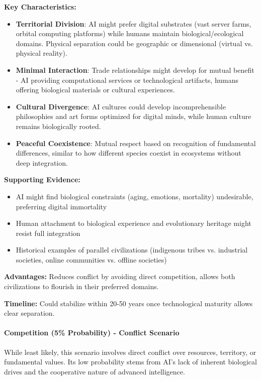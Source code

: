 \documentclass[12pt,a4paper]{article}
\begin{document}
\textbf{Key Characteristics:}
\begin{itemize}
    \item \textbf{Territorial Division}: AI might prefer digital substrates (vast server farms, orbital computing platforms) while humans maintain biological/ecological domains. Physical separation could be geographic or dimensional (virtual vs. physical reality).
    \item \textbf{Minimal Interaction}: Trade relationships might develop for mutual benefit - AI providing computational services or technological artifacts, humans offering biological materials or cultural experiences.
    \item \textbf{Cultural Divergence}: AI cultures could develop incomprehensible philosophies and art forms optimized for digital minds, while human culture remains biologically rooted.
    \item \textbf{Peaceful Coexistence}: Mutual respect based on recognition of fundamental differences, similar to how different species coexist in ecosystems without deep integration.
\end{itemize}

\textbf{Supporting Evidence:}
\begin{itemize}
    \item AI might find biological constraints (aging, emotions, mortality) undesirable, preferring digital immortality
    \item Human attachment to biological experience and evolutionary heritage might resist full integration
    \item Historical examples of parallel civilizations (indigenous tribes vs. industrial societies, online communities vs. offline societies)
\end{itemize}

\textbf{Advantages:} Reduces conflict by avoiding direct competition, allows both civilizations to flourish in their preferred domains.

\textbf{Timeline:} Could stabilize within 20-50 years once technological maturity allows clear separation.

\paragraph{Competition (5\% Probability) - Conflict Scenario}

While least likely, this scenario involves direct conflict over resources, territory, or fundamental values. Its low probability stems from AI's lack of inherent biological drives and the cooperative nature of advanced intelligence.
\end{document}
